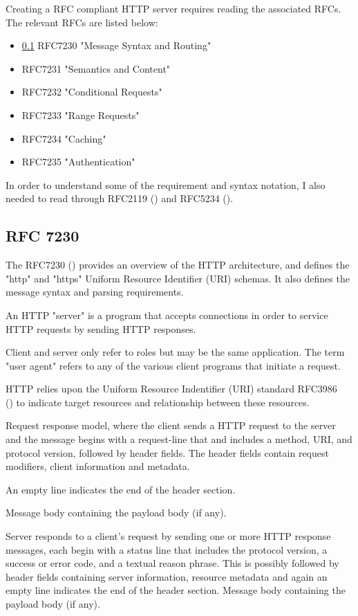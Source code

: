\documentclass[12pt, a4paper]{article}
\begin{document}
Creating a RFC compliant HTTP server requires reading the associated RFCs. The relevant RFCs are listed
below:
\begin{itemize}
    \item \ref{sec:rfc7230} RFC7230 "Message Syntax and Routing"
    \item RFC7231 "Semantics and Content"
    \item RFC7232 "Conditional Requests"
    \item RFC7233 "Range Requests"
    \item RFC7234 "Caching"
    \item RFC7235 "Authentication"
\end{itemize}

In order to understand some of the requirement and syntax notation, I also needed to read through
RFC2119 (\cite{rfc2119}) and RFC5234 (\cite{rfc5234}).

\subsection{RFC 7230}
\label{sec:rfc7230}

The RFC7230 (\cite{rfc7230}) provides an overview of the HTTP architecture, and defines the "http"
and "https" Uniform Resource Identifier (URI) schemas. It also defines the message syntax and parsing
requirements.

An HTTP "server" is a program that accepts connections in order to service HTTP requests by sending
HTTP responses.

Client and server only refer to roles but may be the same application. The term "user agent" refers
to any of the various client programs that initiate a request.

HTTP relies upon the Uniform Resource Indentifier (URI) standard RFC3986 \\ (\cite{rfc3986}) to indicate
target resources and relationship between these resources.

Request response model, where the client sends a HTTP request to the server and the message begins
with a request-line that and includes a method, URI, and protocol version, followed by header fields.
The header fields contain request modifiers, client information and metadata.

An empty line indicates the end of the header section.

Message body containing the payload body (if any).

Server responds to a client's request by sending one or more HTTP response messages, each begin with
a status line that includes the protocol version, a success or error code, and a textual reason
phrase. This is possibly followed by header fields containing server information, resource metadata
and again an empty line indicates the end of the header section. Message body containing the payload
body (if any).
\end{document}
